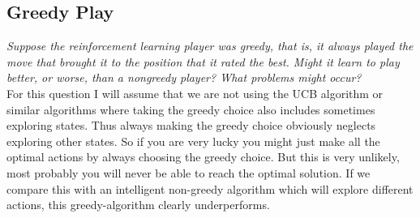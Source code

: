 \documentclass[12pt,a4paper]{article}
\begin{document}
\subsection{Greedy Play }
\textit{Suppose the reinforcement learning player was greedy, that is, it always played the move that brought it to the position that it rated the best. Might it learn to play better, or worse, than a nongreedy player? What problems might occur?}\\ 

For this question I will assume that we are not using the UCB algorithm or similar algorithms where taking the greedy choice also includes sometimes exploring states. Thus always making the greedy choice obviously neglects exploring other states. So if you are very lucky you might just make all the optimal actions by always choosing the greedy choice. But this is very unlikely, most probably you will never be able to reach the optimal solution. If we compare this with an intelligent non-greedy algorithm which will explore different actions, this greedy-algorithm clearly underperforms. 



		
\end{document}
